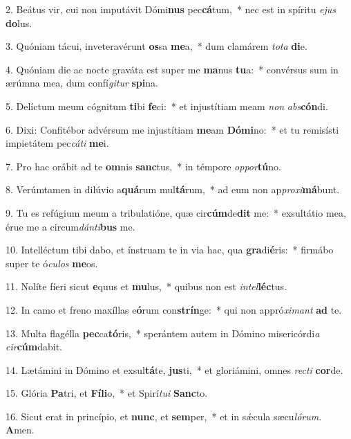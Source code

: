 2. Beátus vir, cui non imputávit Dómi\textbf{nus} pec\textbf{cá}tum,~*  nec est in spíritu \textit{e}\textit{jus} \textbf{do}lus.\

3. Quóniam tácui, inveteravérunt \textbf{os}sa \textbf{me}a,~*  dum clamárem \textit{to}\textit{ta} \textbf{di}e.\

4. Quóniam die ac nocte graváta est super me \textbf{ma}nus \textbf{tu}a:~*  convérsus sum in ærúmna mea, dum confí\textit{gi}\textit{tur} \textbf{spi}na.\

5. Delíctum meum cógnitum \textbf{ti}bi \textbf{fe}ci:~*  et injustítiam meam \textit{non} \textit{abs}\textbf{cón}di.\

6. Dixi: Confitébor advérsum me injustítiam \textbf{me}am \textbf{Dó}\textbf{mi}no:~*  et tu remisísti impietátem pec\textit{cá}\textit{ti} \textbf{me}i.\

7. Pro hac orábit ad te \textbf{om}nis \textbf{sanc}tus,~*  in témpore \textit{op}\textit{por}\textbf{tú}no.\

8. Verúmtamen in dilúvio a\textbf{quá}rum mul\textbf{tá}rum,~*  ad eum non ap\textit{pro}\textit{xi}\textbf{má}bunt.\

9. Tu es refúgium meum a tribulatióne, quæ cir\textbf{cúm}de\textbf{dit} me:~*  exsultátio mea, érue me a circum\textit{dán}\textit{ti}\textbf{bus} me.\

10. Intelléctum tibi dabo, et ínstruam te in via hac, qua \textbf{gra}di\textbf{é}ris:~*  firmábo super te ó\textit{cu}\textit{los} \textbf{me}os.\

11. Nolíte fíeri sicut \textbf{e}quus et \textbf{mu}lus,~*  quibus non est \textit{in}\textit{tel}\textbf{léc}tus.\

12. In camo et freno maxíllas e\textbf{ó}rum con\textbf{strín}ge:~*  qui non appró\textit{xi}\textit{mant} \textbf{ad} te.\

13. Multa flagélla \textbf{pec}ca\textbf{tó}ris,~*  sperántem autem in Dómino misericórdi\textit{a} \textit{cir}\textbf{cúm}dabit.\

14. Lætámini in Dómino et exsul\textbf{tá}te, \textbf{jus}ti,~*  et gloriámini, omnes \textit{rec}\textit{ti} \textbf{cor}de.\

15. Glória \textbf{Pa}tri, et \textbf{Fí}\textbf{li}o,~*  et Spirí\textit{tu}\textit{i} \textbf{Sanc}to.\

16. Sicut erat in princípio, et \textbf{nunc}, et \textbf{sem}per,~*  et in sǽcula sæcu\textit{ló}\textit{rum}. \textbf{A}men.\


